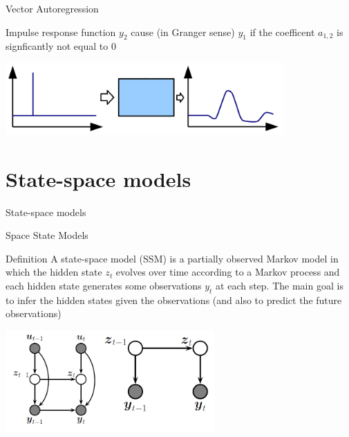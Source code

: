\documentclass[11pt]{beamer}
\begin{document}
\begin{frame}{Vector Autoregression \cite{hamilton2020time}}
\begin{alertblock}{Impulse response function}
$y_{2}$ cause (in Granger sense) $y_{1}$ if the coefficent $a_{1,2}$ is signficantly not equal to 0
\begin{center}
     \includegraphics[width=0.8\textwidth]{Pic/irf.png}
    \end{center}
    \end{alertblock}
\end{frame}

\section{State-space models}
\begin{frame}
\begin{center}
\Huge
State-space models
\end{center}
\end{frame}

\begin{frame}{Space State Models  \cite{pml2Book}}
\begin{alertblock}{Definition}
A state-space model (SSM) is a partially observed Markov model in which the hidden state $z_{t}$ evolves over time according to a Markov process and each hidden state generates some observations $y_{t}$ at each step. The main goal is to infer the hidden states given the observations (and also to predict the future observations)
\begin{center}
     \includegraphics[width=0.6\textwidth]{Pic/SSM.png}
    \end{center}
    \end{alertblock}
\end{frame}
\end{document}
